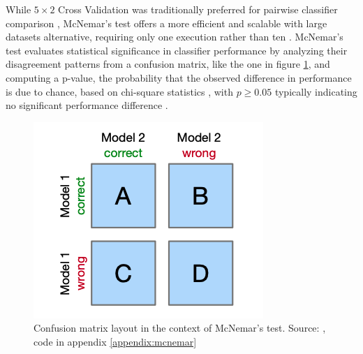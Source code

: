 While $5 \times 2$ Cross Validation was traditionally preferred for pairwise classifier comparison \cite{dietterich_1998_mcnemar}, McNemar's test offers a more efficient and scalable with large datasets alternative, requiring only one execution rather than ten \cite{raschka_2018_mcnemar}. McNemar's test evaluates statistical significance in classifier performance by analyzing their disagreement patterns from a confusion matrix, like the one in figure \ref{fig:confusion_mcnemar}, and computing a p-value, the probability that the observed difference in performance is due to chance, based on chi-square statistics \cite{dietterich_1998_mcnemar}, with $p \ge 0.05$ typically indicating no significant performance difference \cite{raschka_2018_mcnemar} \cite{dietterich_1998_mcnemar}.

\begin{figure}
    \centering
    \includegraphics[width=0.5\linewidth]{images/mcnemar_matrix.png}
    \caption{Confusion matrix layout in the context of McNemar's test. Source: \cite{raschka_2018_mcnemar}, code in appendix \ref{appendix:mcnemar}}
    \label{fig:confusion_mcnemar}
\end{figure}


